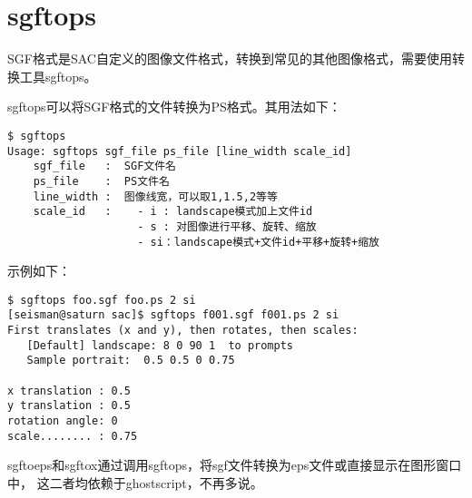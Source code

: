 \section{sgftops}
\label{sec:sgftops}
\label{sec:sgftoeps}
\label{sec:sgftox}

SGF格式是SAC自定义的图像文件格式，转换到常见的其他图像格式，需要使用转换工具sgftops。

sgftops可以将SGF格式的文件转换为PS格式。其用法如下：
\begin{lstlisting}[style=Shell]
$ sgftops
Usage: sgftops sgf_file ps_file [line_width scale_id]
	sgf_file   :  SGF文件名
	ps_file    :  PS文件名
	line_width :  图像线宽，可以取1,1.5,2等等
	scale_id   :  	- i : landscape模式加上文件id
					- s : 对图像进行平移、旋转、缩放
					- si：landscape模式+文件id+平移+旋转+缩放
\end{lstlisting}

示例如下：
\begin{lstlisting}[style=Shell]
$ sgftops foo.sgf foo.ps 2 si
[seisman@saturn sac]$ sgftops f001.sgf f001.ps 2 si
First translates (x and y), then rotates, then scales:
   [Default] landscape: 8 0 90 1  to prompts
   Sample portrait:  0.5 0.5 0 0.75
       
x translation : 0.5  
y translation : 0.5
rotation angle: 0
scale........ : 0.75
\end{lstlisting}

sgftoeps和sgftox通过调用sgftops，将sgf文件转换为eps文件或直接显示在图形窗口中，
这二者均依赖于ghostscript，不再多说。
